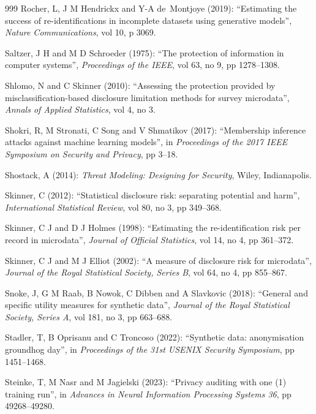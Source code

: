 \begin{thebibliography}{999}
Rocher, L, J M Hendrickx and Y-A de~Montjoye (2019): ``Estimating the success of re-identifications in incomplete datasets using generative models'', \emph{Nature Communications}, vol 10, p 3069.

Saltzer, J H and M D Schroeder (1975): ``The protection of information in computer systems'', \emph{Proceedings of the IEEE}, vol 63, no 9, pp 1278--1308.

Shlomo, N and C Skinner (2010): ``Assessing the protection provided by misclassification-based disclosure limitation methods for survey microdata'', \emph{Annals of Applied Statistics}, vol 4, no 3.

Shokri, R, M Stronati, C Song and V Shmatikov (2017): ``Membership inference attacks against machine learning models'', in \emph{Proceedings of the 2017 IEEE Symposium on Security and Privacy}, pp 3--18.

Shostack, A (2014): \emph{Threat Modeling: Designing for Security}, Wiley, Indianapolis.

Skinner, C (2012): ``Statistical disclosure risk: separating potential and harm'', \emph{International Statistical Review}, vol 80, no 3, pp 349--368.

Skinner, C J and D J Holmes (1998): ``Estimating the re-identification risk per record in microdata'', \emph{Journal of Official Statistics}, vol 14, no 4, pp 361--372.

Skinner, C J and M J Elliot (2002): ``A measure of disclosure risk for microdata'', \emph{Journal of the Royal Statistical Society, Series B}, vol 64, no 4, pp 855--867.

Snoke, J, G M Raab, B Nowok, C Dibben and A Slavkovic (2018): ``General and specific utility measures for synthetic data'', \emph{Journal of the Royal Statistical Society, Series A}, vol 181, no 3, pp 663--688.

Stadler, T, B Oprisanu and C Troncoso (2022): ``Synthetic data: anonymisation groundhog day'', in \emph{Proceedings of the 31st USENIX Security Symposium}, pp 1451--1468.

Steinke, T, M Nasr and M Jagielski (2023): ``Privacy auditing with one (1) training run'', in \emph{Advances in Neural Information Processing Systems 36}, pp 49268--49280.


\end{thebibliography}
